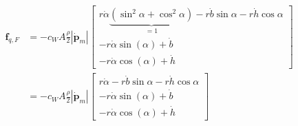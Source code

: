 \begin{align*}
	\textbf{f}_{q,F} &= -c_W A \frac{\rho}{2}|\dot{\textbf{p}}_m|
	\left[\begin{matrix}
		r\dot{\alpha}\underbrace{\left( \sin^2\alpha + \cos^2\alpha \right)}_{=1} - r\dot{b}\sin\alpha - r\dot{h}\cos\alpha \\
		-r\dot{\alpha}\sin \left( \alpha \right) + \dot{b} \\
		-r\dot{\alpha}\cos \left( \alpha \right) +\dot{h}
	\end{matrix}
	\right] \\
	&= -c_W A \frac{\rho}{2}|\dot{\textbf{p}}_m|
	\left[\begin{matrix}
	r\dot{\alpha} - r\dot{b}\sin\alpha - r\dot{h}\cos\alpha \\
	-r\dot{\alpha}\sin \left( \alpha \right) + \dot{b} \\
	-r\dot{\alpha}\cos \left( \alpha \right) +\dot{h}
	\end{matrix}
	\right]
\end{align*}